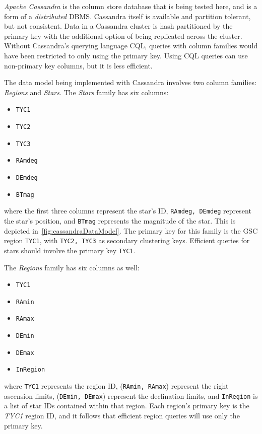 \textit{Apache Cassandra} is the column store database that is being tested here, and is a form of a
\textit{distributed} DBMS\@.
Cassandra itself is available and partition tolerant, but not consistent.
Data in a Cassandra cluster is hash partitioned by the primary key with the additional option of being replicated
across the cluster.
Without Cassandra's querying language CQL, queries with column families would have been restricted to only using the
primary key.
Using CQL queries can use non-primary key columns, but it is less efficient.

The data model being implemented with Cassandra involves two column families: \textit{Regions} and \textit{Stars}.
The \textit{Stars} family has six columns:
\begin{multicols}{3}
    \begin{itemize}
        \item[] \texttt{TYC1}
        \item[] \texttt{TYC2}
        \item[] \texttt{TYC3}
        \item[] \texttt{RAmdeg}
        \item[] \texttt{DEmdeg}
        \item[] \texttt{BTmag}
    \end{itemize}
\end{multicols}
where the first three columns represent the star's ID, \texttt{RAmdeg, DEmdeg} represent the star's position, and
\texttt{BTmag} represents the magnitude of the star.
This is depicted in~\autoref{fig:cassandraDataModel}.
The primary key for this family is the GSC region \texttt{TYC1}, with \texttt{TYC2, TYC3} as secondary clustering
keys.
Efficient queries for stars should involve the primary key \texttt{TYC1}.

The \textit{Regions} family has six columns as well:
\begin{multicols}{3}
    \begin{itemize}
        \item[] \texttt{TYC1}
        \item[] \texttt{RAmin}
        \item[] \texttt{RAmax}
        \item[] \texttt{DEmin}
        \item[] \texttt{DEmax}
        \item[] \texttt{InRegion}
    \end{itemize}
\end{multicols}
where \texttt{TYC1} represents the region ID, (\texttt{RAmin, RAmax}) represent the right ascension limits,
(\texttt{DEmin, DEmax}) represent the declination limits, and \texttt{InRegion} is a list of star IDs contained within
that region.
Each region's primary key is the \textit{TYC1} region ID, and it follows that efficient region queries will use only
the primary key.

